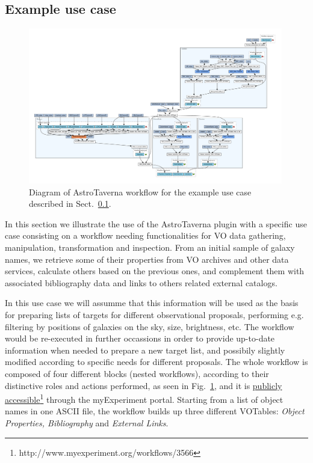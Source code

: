 \documentclass{aa}
\begin{document}
\subsection{Example use case}
\label{Usecase}

\begin{figure}[tb]
\centering 
\includegraphics[width=0.99\textwidth]{WfDiagram}
\caption{Diagram of AstroTaverna workflow for the example use case described in Sect.~\ref{Usecase}.}
\label{fig:WfDiagram}
\end{figure}

In this section we illustrate the use of the AstroTaverna plugin with a specific use case consisting on a workflow needing functionalities for VO data gathering, manipulation, transformation and inspection. From an initial sample of galaxy names, we retrieve some of their properties from VO archives and other data services, calculate others based on the previous ones, and complement them with associated bibliography data and links to others related external catalogs.

In this use case we will assumme that this information will be used as the basis for preparing lists of targets for different observational proposals, performing e.g. filtering by positions of galaxies on the sky, size, brightness, etc. The workflow would be re-executed in further occassions in order to provide up-to-date information when needed to prepare a new target list, and possibily slightly modified according to specific needs for different proposals. The whole workflow is composed of four different blocks (nested workflows), according to their distinctive roles and actions performed, as seen in Fig.~\ref{fig:WfDiagram}, and it is \href{http://www.myexperiment.org/workflows/3566}{publicly accessible}\footnote{http://www.myexperiment.org/workflows/3566} through the myExperiment portal. Starting from a list of object names in one ASCII file, the workflow builds up three different VOTables: \textit{Object Properties, Bibliography} and \textit{External Links}.
\end{document}

